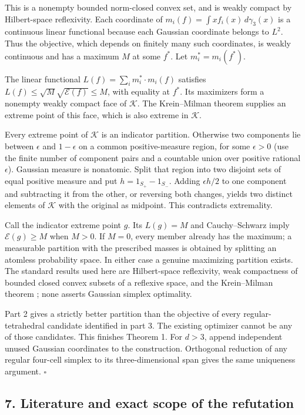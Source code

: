 \documentclass[
  11pt,
]{article}
\begin{document}
This is a nonempty bounded norm-closed convex set, and is weakly compact
by Hilbert-space reflexivity. Each coordinate of
\(m_i(f)=\int x f_i(x)\,d\gamma_3(x)\) is a continuous linear functional
because each Gaussian coordinate belongs to \(L^2\). Thus the objective,
which depends on finitely many such coordinates, is weakly continuous
and has a maximum \(M\) at some \(f^*\). Let \(m_i^*=m_i(f^*)\).

The linear functional \(L(f)=\sum_i m_i^*\cdot m_i(f)\) satisfies
\(L(f)\le\sqrt M\sqrt{\mathcal E(f)}\le M\), with equality at \(f^*\).
Its maximizers form a nonempty weakly compact face of \(\mathcal K\).
The Krein--Milman theorem supplies an extreme point of this face, which
is also extreme in \(\mathcal K\).

Every extreme point of \(\mathcal K\) is an indicator partition.
Otherwise two components lie between \(\epsilon\) and \(1-\epsilon\) on
a common positive-measure region, for some \(\epsilon>0\) (use the
finite number of component pairs and a countable union over positive
rational \(\epsilon\)). Gaussian measure is nonatomic. Split that region
into two disjoint sets of equal positive measure and put
\(h=1_{S_+}-1_{S_-}\). Adding \(\epsilon h/2\) to one component and
subtracting it from the other, or reversing both changes, yields two
distinct elements of \(\mathcal K\) with the original as midpoint. This
contradicts extremality.

Call the indicator extreme point \(g\). Its \(L(g)=M\) and
Cauchy--Schwarz imply \(\mathcal E(g)\ge M\) when \(M>0\). If \(M=0\),
every member already has the maximum; a measurable partition with the
prescribed masses is obtained by splitting an atomless probability
space. In either case a genuine maximizing partition exists. The
standard results used here are Hilbert-space reflexivity, weak
compactness of bounded closed convex subsets of a reflexive space, and
the Krein--Milman theorem \cite{Rudin}; none asserts Gaussian simplex optimality.

Part 2 gives a strictly better partition than the objective of every
regular-tetrahedral candidate identified in part 3. The existing
optimizer cannot be any of those candidates. This finishes Theorem 1.
For \(d>3\), append independent unused Gaussian coordinates to the
construction. Orthogonal reduction of any regular four-cell simplex to
its three-dimensional span gives the same uniqueness argument.
\(\square\)

\subsection{7. Literature and exact scope of the
refutation}\label{literature-and-exact-scope-of-the-refutation}
\end{document}
